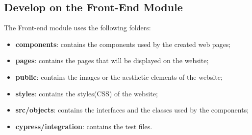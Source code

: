 \subsection{Develop on the Front-End Module}
The Front-end module uses the following folders:
\begin{itemize}
\item \textbf{components}: contains the components used by the created web pages;
\item \textbf{pages}: contains the pages that will be displayed on the website;
\item \textbf{public}: contains the images or the aesthetic elements of the website;
\item \textbf{styles}: contains the styles(CSS) of the website;
\item \textbf{src/objects}: contains the interfaces and the classes used by the components;
\item \textbf{cypress/integration}: contains the test files. 
\end{itemize}